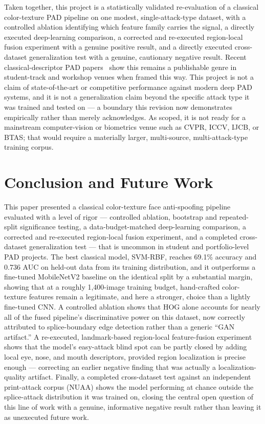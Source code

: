 \documentclass[11pt]{article}
\begin{document}
Taken together, this project is a statistically validated re-evaluation of a classical color-texture PAD pipeline on one modest, single-attack-type dataset, with a controlled ablation identifying which feature family carries the signal, a directly executed deep-learning comparison, a corrected and re-executed region-local fusion experiment with a genuine positive result, and a directly executed cross-dataset generalization test with a genuine, cautionary negative result. Recent classical-descriptor PAD papers~\cite{gunay2023,chang2022} show this remains a publishable genre in student-track and workshop venues when framed this way. This project is not a claim of state-of-the-art or competitive performance against modern deep PAD systems, and it is not a generalization claim beyond the specific attack type it was trained and tested on --- a boundary this revision now demonstrates empirically rather than merely acknowledges. As scoped, it is not ready for a mainstream computer-vision or biometrics venue such as CVPR, ICCV, IJCB, or BTAS; that would require a materially larger, multi-source, multi-attack-type training corpus.

\section{Conclusion and Future Work}

This paper presented a classical color-texture face anti-spoofing pipeline evaluated with a level of rigor --- controlled ablation, bootstrap and repeated-split significance testing, a data-budget-matched deep-learning comparison, a corrected and re-executed region-local fusion experiment, and a completed cross-dataset generalization test --- that is uncommon in student and portfolio-level PAD projects. The best classical model, SVM-RBF, reaches 69.1\% accuracy and 0.736 AUC on held-out data from its training distribution, and it outperforms a fine-tuned MobileNetV2 baseline on the identical split by a substantial margin, showing that at a roughly 1,400-image training budget, hand-crafted color-texture features remain a legitimate, and here a stronger, choice than a lightly fine-tuned CNN. A controlled ablation shows that HOG alone accounts for nearly all of the fused pipeline's discriminative power on this dataset, now correctly attributed to splice-boundary edge detection rather than a generic ``GAN artifact.'' A re-executed, landmark-based region-local feature-fusion experiment shows that the model's easy-attack blind spot can be partly closed by adding local eye, nose, and mouth descriptors, provided region localization is precise enough --- correcting an earlier negative finding that was actually a localization-quality artifact. Finally, a completed cross-dataset test against an independent print-attack corpus (NUAA) shows the model performing at chance outside the splice-attack distribution it was trained on, closing the central open question of this line of work with a genuine, informative negative result rather than leaving it as unexecuted future work.
\end{document}
